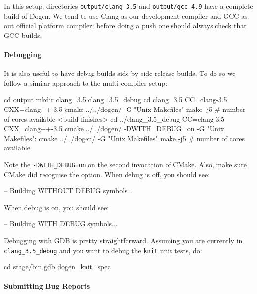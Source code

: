 \documentclass{book}
\begin{document}
In this setup, directories \texttt{output/clang\_3.5} and
\texttt{output/gcc\_4.9} have a complete build of Dogen. We tend to
use Clang as our development compiler and GCC as out official platform
compiler; before doing a push one should always check that GCC builds.

\paragraph{Debugging}

It is also useful to have debug builds side-by-side release builds. To
do so we follow a similar approach to the multi-compiler setup:

\begin{pseudocode}[backgroundcolor=\color{lightgray}]
cd output
mkdir clang_3.5 clang_3.5_debug
cd clang_3.5
CC=clang-3.5 CXX=clang++-3.5 cmake ../../dogen/ -G "Unix Makefiles"
make -j5 # number of cores available
<build finishes>
cd ../clang_3.5_debug
CC=clang-3.5 CXX=clang++-3.5 cmake ../../dogen/ -DWITH_DEBUG=on -G "Unix Makefiles": cmake ../../dogen/ -G "Unix Makefiles"
make -j5 # number of cores available
\end{pseudocode}

Note the \texttt{-DWITH\_DEBUG=on} on the second invocation of
CMake. Also, make sure CMake did recognise the option. When debug is
off, you should see:

\begin{pseudocode}[backgroundcolor=\color{lightgray}]
-- Building WITHOUT DEBUG symbols...
\end{pseudocode}

When debug is on, you should see:

\begin{pseudocode}[backgroundcolor=\color{lightgray}]
-- Building WITH DEBUG symbols...
\end{pseudocode}

Debugging with GDB is pretty straightforward. Assuming you are
currently in \texttt{clang\_3.5\_debug} and you want to debug the
\texttt{knit} unit tests, do:

\begin{pseudocode}[backgroundcolor=\color{lightgray}]
cd stage/bin
gdb dogen_knit_spec
\end{pseudocode}

\paragraph{Submitting Bug Reports}
\end{document}
